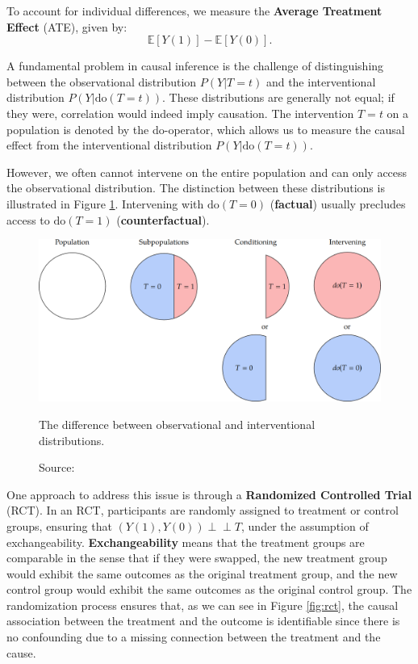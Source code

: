 To account for individual differences, we measure the
\textbf{Average Treatment Effect} (ATE), given by:
\begin{equation}
\mathbb{E}[Y(1)] - \mathbb{E}[Y(0)].
\end{equation}

A fundamental problem in causal inference is the challenge
of distinguishing between the observational distribution
\( P(Y|T=t) \) and the interventional distribution \( P(Y|\text{do}(T=t)) \).
These distributions are generally not equal; if they were, correlation
would indeed imply causation. The intervention \( T=t \) on a population
is denoted by the do-operator, which allows us to measure the causal
effect from the interventional distribution \( P(Y|\text{do}(T=t)) \).

However, we often cannot intervene on the entire population
and can only access the observational distribution.
The distinction between these distributions is illustrated
in Figure \ref{fig:dooperator}.
Intervening with \( \text{do}(T=0) \) (\textbf{factual}) usually
precludes access to \( \text{do}(T=1) \) (\textbf{counterfactual}).

\begin{figure}[h]
    \centering
    \includegraphics[width=\textwidth]{figures/ch3/12.dooperator.png}
    \caption{The difference between observational and interventional distributions.}
    \vspace{-10px}
    \caption*{\scriptsize{Source: \cite{Neal_2020a}}}
    \label{fig:dooperator}
\end{figure}

One approach to address this issue is
through a \textbf{Randomized Controlled Trial} (RCT). In an RCT, participants
are randomly assigned to treatment or control groups, ensuring that
\( (Y(1), Y(0)) \perp\!\!\!\perp T \), under the assumption of exchangeability.
\textbf{Exchangeability} means that the treatment groups are comparable in the
sense that if they were swapped, the new treatment group would exhibit
the same outcomes as the original treatment group, and the new control
group would exhibit the same outcomes as the original control group.
The randomization process ensures that, as we can see in Figure \ref{fig:rct},
the causal association between the treatment and the outcome is identifiable
since there is no confounding due to a missing connection between the
treatment and the cause.

